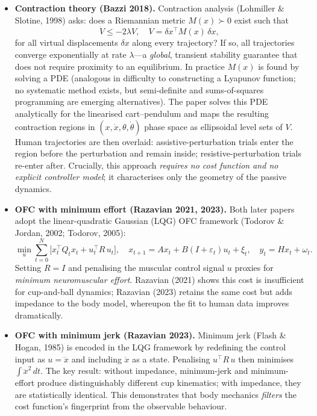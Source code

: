 \documentclass[11pt]{article}
\begin{document}
\begin{itemize}[leftmargin=1.2em]
  \item \textbf{Contraction theory (Bazzi 2018).}
  Contraction analysis (Lohmiller \& Slotine, 1998) asks: does a Riemannian metric $M(x)\succ 0$ exist such that
  \[
    \dot{V} \leq -2\lambda V, \quad V = \delta x^\top M(x)\,\delta x,
  \]
  for all virtual displacements $\delta x$ along every trajectory?  If so, all trajectories converge exponentially at rate $\lambda$---a \emph{global}, transient stability guarantee that does not require proximity to an equilibrium.  In practice $M(x)$ is found by solving a PDE (analogous in difficulty to constructing a Lyapunov function; no systematic method exists, but semi-definite and sums-of-squares programming are emerging alternatives).  The paper solves this PDE analytically for the linearised cart--pendulum and maps the resulting contraction regions in $(x,\dot{x},\theta,\dot{\theta})$ phase space as ellipsoidal level sets of $V$.  Human trajectories are then overlaid: assistive-perturbation trials enter the region before the perturbation and remain inside; resistive-perturbation trials re-enter after.  Crucially, this approach \emph{requires no cost function and no explicit controller model}; it characterises only the geometry of the passive dynamics.

  \item \textbf{OFC with minimum effort (Razavian 2021, 2023).}
  Both later papers adopt the linear-quadratic Gaussian (LQG) OFC framework (Todorov \& Jordan, 2002; Todorov, 2005):
  \[
    \min_{u} \sum_{t=0}^{N} \bigl[ x_t^\top Q_t x_t + u_t^\top R\, u_t \bigr],
    \quad
    x_{t+1} = A x_t + B(I + \varepsilon_t) u_t + \xi_t,
    \quad
    y_t = H x_t + \omega_t.
  \]
  Setting $R = I$ and penalising the muscular control signal $u$ proxies for \emph{minimum neuromuscular effort}.  Razavian (2021) shows this cost is insufficient for cup-and-ball dynamics; Razavian (2023) retains the same cost but adds impedance to the body model, whereupon the fit to human data improves dramatically.

  \item \textbf{OFC with minimum jerk (Razavian 2023).}
  Minimum jerk (Flash \& Hogan, 1985) is encoded in the LQG framework by redefining the control input as $u = \dddot{x}$ and including $\ddot{x}$ as a state.  Penalising $u^\top R\, u$ then minimises $\int \dddot{x}^2\,dt$.  The key result: without impedance, minimum-jerk and minimum-effort produce distinguishably different cup kinematics; with impedance, they are statistically identical.  This demonstrates that body mechanics \emph{filters} the cost function's fingerprint from the observable behaviour.


\end{itemize}
\end{document}
